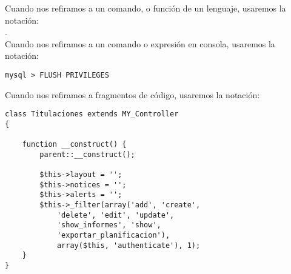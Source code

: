 Cuando nos refiramos a un comando, o función de un lenguaje, usaremos
la notación: \\ .\\

Cuando nos refiramos a un comando o expresión en consola, usaremos la notación:
\begin{lstlisting}[style=consola]
	mysql > FLUSH PRIVILEGES
\end{lstlisting}

Cuando nos refiramos a fragmentos de código, usaremos la notación:
\begin{lstlisting}[style=PHP]
class Titulaciones extends MY_Controller 
{

    function __construct() {
        parent::__construct();

        $this->layout = '';
        $this->notices = '';
        $this->alerts = '';
        $this->_filter(array('add', 'create', 
			'delete', 'edit', 'update',
			'show_informes', 'show', 
			'exportar_planificacion'), 
			array($this, 'authenticate'), 1); 
	}
}
\end{lstlisting}
